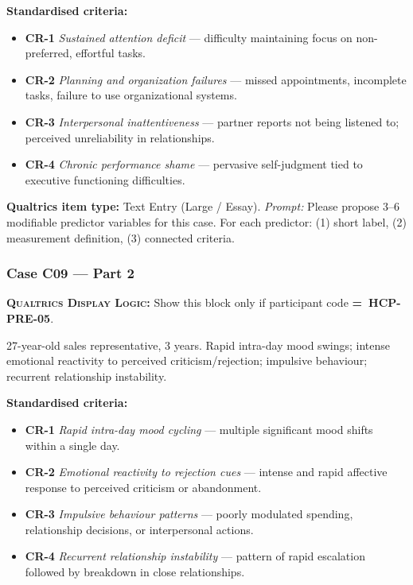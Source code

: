 \documentclass[11pt,a4paper]{article}
\newcommand{\responsetextarea}[1]{\begin{tcolorbox}[colback=ResponseBG,colframe=GoldAmber,boxrule=0.6pt,arc=1.5mm,left=6pt,right=6pt,top=5pt,bottom=5pt]\small\textbf{\color{GoldAmber}Qualtrics item type:} Text Entry (Large / Essay). \quad \textit{Prompt:} #1\end{tcolorbox}}
\newcommand{\dlnote}[1]{\par\vspace{0.15em}\noindent\begin{tcolorbox}[colback=AccentAmber,colframe=GoldAmber,boxrule=0.45pt,arc=1mm,left=5pt,right=5pt,top=2.5pt,bottom=2.5pt]\footnotesize\textbf{\color{GoldAmber}\scshape Qualtrics Display Logic:} Show this block only if participant code \textbf{=~#1}.\end{tcolorbox}\vspace{0.1em}}
\begin{document}
\begin{contextbox}
\small\textbf{Standardised criteria:}
\begin{itemize}[topsep=2pt,itemsep=1pt]
\item \textbf{CR-1} \textit{Sustained attention deficit} --- difficulty maintaining focus on non-preferred, effortful tasks.
\item \textbf{CR-2} \textit{Planning and organization failures} --- missed appointments, incomplete tasks, failure to use organizational systems.
\item \textbf{CR-3} \textit{Interpersonal inattentiveness} --- partner reports not being listened to; perceived unreliability in relationships.
\item \textbf{CR-4} \textit{Chronic performance shame} --- pervasive self-judgment tied to executive functioning difficulties.
\end{itemize}
\end{contextbox}

\responsetextarea{Please propose 3--6 modifiable predictor variables for this case. For each predictor: (1) short label, (2) measurement definition, (3) connected criteria.}

\vspace{0.4em}

\subsubsection*{Case C09 --- Part 2}
\dlnote{HCP-PRE-05}

\begin{complaintbox}[title=Case C09 --- Complaint (abbreviated)]
\small 27-year-old sales representative, 3 years. Rapid intra-day mood swings; intense emotional reactivity to perceived criticism/rejection; impulsive behaviour; recurrent relationship instability.
\end{complaintbox}

\begin{contextbox}
\small\textbf{Standardised criteria:}
\begin{itemize}[topsep=2pt,itemsep=1pt]
\item \textbf{CR-1} \textit{Rapid intra-day mood cycling} --- multiple significant mood shifts within a single day.
\item \textbf{CR-2} \textit{Emotional reactivity to rejection cues} --- intense and rapid affective response to perceived criticism or abandonment.
\item \textbf{CR-3} \textit{Impulsive behaviour patterns} --- poorly modulated spending, relationship decisions, or interpersonal actions.
\item \textbf{CR-4} \textit{Recurrent relationship instability} --- pattern of rapid escalation followed by breakdown in close relationships.
\end{itemize}
\end{contextbox}
\end{document}
